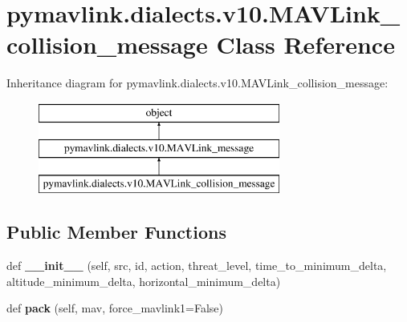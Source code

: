 \hypertarget{classpymavlink_1_1dialects_1_1v10_1_1MAVLink__collision__message}{}\section{pymavlink.\+dialects.\+v10.\+M\+A\+V\+Link\+\_\+collision\+\_\+message Class Reference}
\label{classpymavlink_1_1dialects_1_1v10_1_1MAVLink__collision__message}
Inheritance diagram for pymavlink.\+dialects.\+v10.\+M\+A\+V\+Link\+\_\+collision\+\_\+message\+:\begin{figure}[H]
\begin{center}
\leavevmode
\includegraphics[height=3.000000cm]{classpymavlink_1_1dialects_1_1v10_1_1MAVLink__collision__message}
\end{center}
\end{figure}
\subsection*{Public Member Functions}
\begin{DoxyCompactItemize}
\item 
\mbox{\label{classpymavlink_1_1dialects_1_1v10_1_1MAVLink__collision__message_ae7306ca01490761a6d0aba37f76f9408}} 
def {\bfseries \+\_\+\+\_\+init\+\_\+\+\_\+} (self, src, id, action, threat\+\_\+level, time\+\_\+to\+\_\+minimum\+\_\+delta, altitude\+\_\+minimum\+\_\+delta, horizontal\+\_\+minimum\+\_\+delta)
\item 
\mbox{\label{classpymavlink_1_1dialects_1_1v10_1_1MAVLink__collision__message_a7285950581b42345e32c31e0e5abd8e1}} 
def {\bfseries pack} (self, mav, force\+\_\+mavlink1=False)
\end{DoxyCompactItemize}
